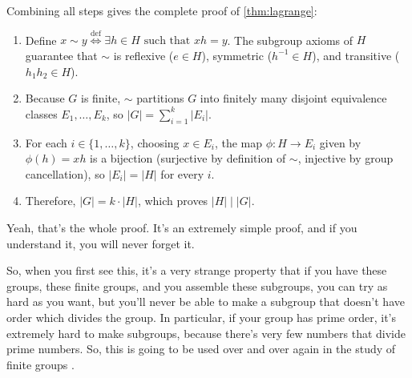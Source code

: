 \begin{proofWrapper}
\begin{content}
\begin{steps}
Combining all steps gives the complete proof of \cref{thm:lagrange}:
\begin{enumerate}[label=\textbf{\arabic*.}]
    \item Define $x \sim y \stackrel{\text{def}}{\iff} \exists h \in H \text{ such that } xh = y$. The subgroup axioms of $H$ guarantee that $\sim$ is reflexive ($e \in H$), symmetric ($h^{-1} \in H$), and transitive ($h_1 h_2 \in H$).
    \item Because $G$ is finite, $\sim$ partitions $G$ into finitely many disjoint equivalence classes $E_1, \dots, E_k$, so $|G| = \sum_{i=1}^k |E_i|$.
    \item For each $i \in \{1, \dots, k\}$, choosing $x \in E_i$, the map $\phi \colon H \to E_i$ given by $\phi(h) = xh$ is a bijection (surjective by definition of $\sim$, injective by group cancellation), so $|E_i| = |H|$ for every $i$.
    \item Therefore, $|G| = k \cdot |H|$, which proves $|H| \mid |G|$.
\end{enumerate}
\end{steps}
\end{content}
\end{proofWrapper}

\begin{speech}[00:26:58 - 00:27:49]
Yeah, that's the whole proof. It's an extremely simple proof, and if you understand it, you will never forget it.

So, when you first see this, it's a very strange property that if you have these groups, these finite groups, and you assemble these subgroups, you can try as hard as you want, but you'll never be able to make a subgroup that doesn't have order which divides the group. In particular, if your group has prime order, it's extremely hard to make subgroups, because there's very few numbers that divide prime numbers. So, this is going to be used over and over again in the study of finite groups .
\end{speech}

